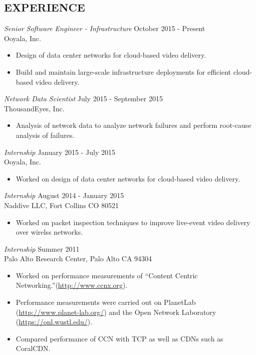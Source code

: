 \documentclass[line,margin]{res}
\begin{document}
\begin{resume}
\section{EXPERIENCE}
    {\sl Senior Software Engineer - Infrastructure} \hfill October 2015 - Present\\
    Ooyala, Inc.
    \begin{itemize}
        \item Design of data center networks for cloud-based video delivery.
        \item Build and maintain large-scale infrastructure deployments for efficient cloud-based video delivery.
    \end{itemize}
	{\sl Network Data Scientist} \hfill July 2015 - September 2015\\
	ThousandEyes, Inc.
	\begin{itemize}
		\item Analysis of network data to analyze network failures and perform
			root-cause analysis of failures.
		\end{itemize}
	{\sl Internship} \hfill January 2015 - July 2015\\
	Ooyala, Inc.
	\begin{itemize}
		\item Worked on design of data center networks for cloud-based video
			delivery.
	\end{itemize}
	{\sl Internship} \hfill August 2014 - January 2015\\
	Naddive LLC, Fort Collins CO 80521
	\begin{itemize}
		\item Worked on packet inspection techniques to improve live-event video
			delivery over wirelss networks.
	\end{itemize}
    {\sl Internship} \hfill Summer 2011\\
      Palo Alto Research Center, Palo Alto CA 94304 \\
      \begin{itemize}
      \item Worked on performance measurements of ``Content Centric
		  Networking.''(\url{http://www.ccnx.org}).
      \item Performance measurements were carried out on PlanetLab (\url{http://www.planet-lab.org/}) and the Open Network
      Laboratory (\url{https://onl.wustl.edu/}).
      \item Compared performance of CCN with TCP as well as CDNs such as CoralCDN.
      \end{itemize}


\end{resume}
\end{document}
